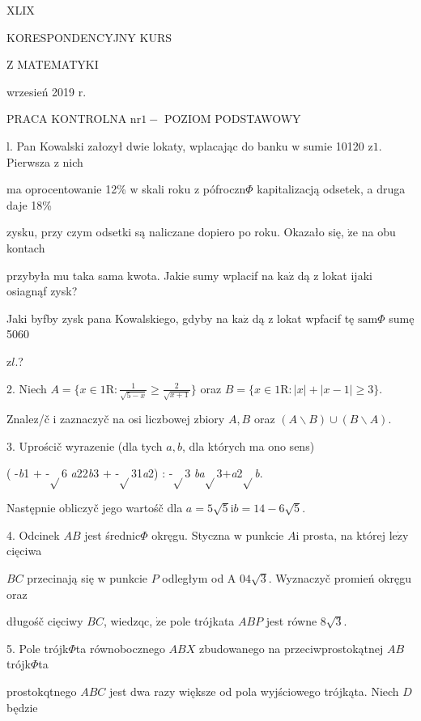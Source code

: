 \documentclass[a4paper,12pt]{article}
\begin{document}
XLIX

KORESPONDENCYJNY KURS

Z MATEMATYKI

wrzesień 2019 r.

PRACA KONTROLNA $\mathrm{n}\mathrm{r} 1 -$ POZIOM PODSTAWOWY

l. Pan Kowalski załozył dwie lokaty, wplacając do banku $\mathrm{w}$ sumie 10120 $\mathrm{z}1$. Pierwsza $\mathrm{z}$ nich

ma oprocentowanie 12\% $\mathrm{w}$ skali roku $\mathrm{z}$ pófroczn$\Phi$ kapitalizacją odsetek, a druga daje 18\%

zysku, przy czym odsetki są naliczane dopiero po roku. Okazało się, $\dot{\mathrm{z}}\mathrm{e}$ na obu kontach

przybyła mu taka sama kwota. Jakie sumy wplacif na $\mathrm{k}\mathrm{a}\dot{\mathrm{z}}$ dą $\mathrm{z}$ lokat ijaki osiagnąf zysk?

Jaki byfby zysk pana Kowalskiego, gdyby na $\mathrm{k}\mathrm{a}\dot{\mathrm{z}}$ dą $\mathrm{z}$ lokat wpfacif tę $\mathrm{s}\mathrm{a}\mathrm{m}\Phi$ sumę 5060

$\mathrm{z}l.$?

2. Niech $A=\displaystyle \{x\in 1\mathrm{R}:\frac{1}{\sqrt{5-x}}\geq\frac{2}{\sqrt{x+1}}\}$ oraz $B=\{x\in 1\mathrm{R}:|x|+|x-1|\geq 3\}.$

Znalez/č $\mathrm{i}$ zaznaczyč na osi liczbowej zbiory $A, B$ oraz $(A\backslash B)\cup(B\backslash A).$

3. Uprościč wyrazenie (dla tych $a, b$, dla których ma ono sens)

( -{\it b}1 $+$ -$\sqrt{}$6 {\it a}22{\it b}3 $+$ -$\sqrt{}$31{\it a}2) : -$\sqrt{}$3 {\it ba}$\sqrt{}$3$+${\it a}2$\sqrt{}${\it b}.

Następnie obliczyč jego wartośč dla $a=5\sqrt{5}\mathrm{i}b=14-6\sqrt{5}.$

4. Odcinek $AB$ jest średnic$\Phi$ okręgu. Styczna $\mathrm{w}$ punkcie $A\mathrm{i}$ prosta, na której $\mathrm{l}\mathrm{e}\dot{\mathrm{z}}\mathrm{y}$ cięciwa

$BC$ przecinają się $\mathrm{w}$ punkcie $P$ odległym od A $04\sqrt{3}$. Wyznaczyč promień okręgu oraz

długośč cięciwy $BC$, wiedzqc, $\dot{\mathrm{z}}\mathrm{e}$ pole trójkata $ABP$ jest równe $8\sqrt{3}.$

5. Pole trójk$\Phi$ta równobocznego $ABX$ zbudowanego na przeciwprostokątnej $AB$ trójk$\Phi$ta

prostokqtnego $ABC$ jest dwa razy większe od pola wyjściowego trójkąta. Niech $D$ będzie
\end{document}

